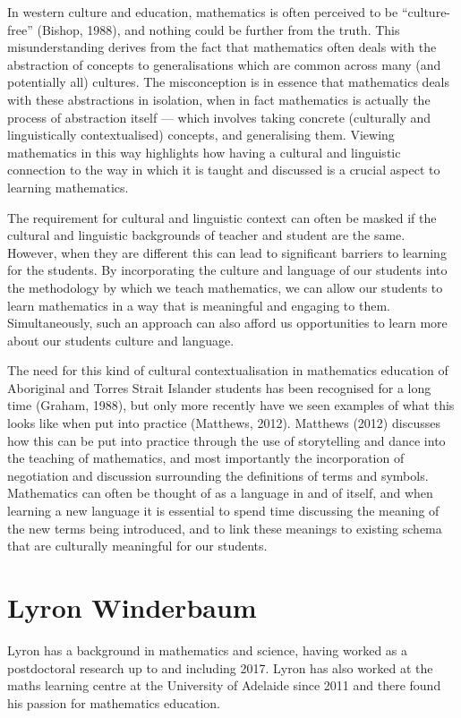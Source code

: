 \documentclass[twoside,14pt,a4paper,notitlepage]{memoir}
\begin{document}
In western culture and education, mathematics is often perceived to be “culture-free” (Bishop, 1988), and nothing could be further from the truth. This misunderstanding derives from the fact that mathematics often deals with the abstraction of concepts to generalisations which are common across many (and potentially all) cultures. The misconception is in essence that mathematics deals with these abstractions in isolation, when in fact mathematics is actually the process of abstraction itself --- which involves taking concrete (culturally and linguistically contextualised) concepts, and generalising them. Viewing mathematics in this way highlights how having a cultural and linguistic connection to the way in which it is taught and discussed is a crucial aspect to learning mathematics. 

The requirement for cultural and linguistic context can often be masked if the cultural and linguistic backgrounds of teacher and student are the same. However, when they are different this can lead to significant barriers to learning for the students. By incorporating the culture and language of our students into the methodology by which we teach mathematics, we can allow our students to learn mathematics in a way that is meaningful and engaging to them. Simultaneously, such an approach can also afford us opportunities to learn more about our students culture and language. 

The need for this kind of cultural contextualisation in mathematics education of Aboriginal and Torres Strait Islander students has been recognised for a long time (Graham, 1988), but only more recently have we seen examples of what this looks like when put into practice (Matthews, 2012). Matthews (2012) discusses how this can be put into practice through the use of storytelling and dance into the teaching of mathematics, and most importantly the incorporation of negotiation and discussion surrounding the definitions of terms and symbols. Mathematics can often be thought of as a language in and of itself, and when learning a new language it is essential to spend time discussing the meaning of the new terms being introduced, and to link these meanings to existing schema that are culturally meaningful for our students.

\section*{Lyron Winderbaum}

Lyron has a background in mathematics and science, having worked as a postdoctoral research up to and including 2017. Lyron has also worked at the maths learning centre at the University of Adelaide since 2011 and there found his passion for mathematics education.
\end{document}
